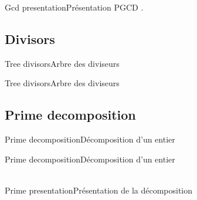 \documentclass[a4paper,english,11pt]{article}
\begin{document}
\begin{myprestex}{Gcd presentation}{Présentation PGCD}
.
\end{myprestex}

\subsection{Divisors}

\begin{myprestexcode}{Tree divisors}{Arbre des diviseurs}

\end{myprestexcode}

\begin{myprestex}{Tree divisors}{Arbre des diviseurs}
\end{myprestex}

\subsection{Prime decomposition}

\begin{myprestexcode}{Prime decomposition}{Décomposition d'un entier}

\end{myprestexcode}

\begin{myprestex}{Prime decomposition}{Décomposition d'un entier}
\\
\\
\end{myprestex}

\begin{myprestexcode}{Prime presentation}{Présentation de la décomposition}

\end{myprestexcode}
\end{document}
